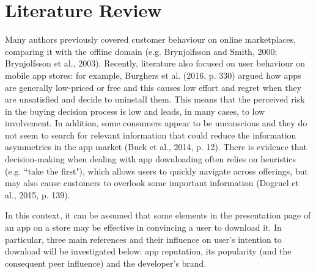 

\chapter{Literature Review}
\label{chapter2}
\thispagestyle{empty}

Many authors previously covered customer behaviour on online marketplaces, comparing it with the offline domain (e.g. Brynjolfsson and Smith, 2000; Brynjolfsson et al., 2003). Recently, literature also focused on user behaviour on mobile app stores: for example, Burghers et al. (2016, p. 330) argued how apps are generally low-priced or free and this causes low effort and regret when they are unsatisfied and decide to uninstall them. This means that the perceived risk in the buying decision process is low and leads, in many cases, to low involvement. In addition, some consumers appear to be unconscious and they do not seem to search for relevant information that could reduce the information asymmetries in the app market (Buck et al., 2014, p. 12). There is evidence that decision-making when dealing with app downloading often relies on heuristics (e.g. ``take the first"), which allows users to quickly navigate across offerings, but may also cause customers to overlook some important information (Dogruel et al., 2015, p. 139).

In this context, it can be assumed that some elements in the presentation page of an app on a store may be effective in convincing a user to download it. In particular, three main references and their influence on user's intention to download will be investigated below: app reputation, its popularity (and the consequent peer influence) and the developer's brand.

